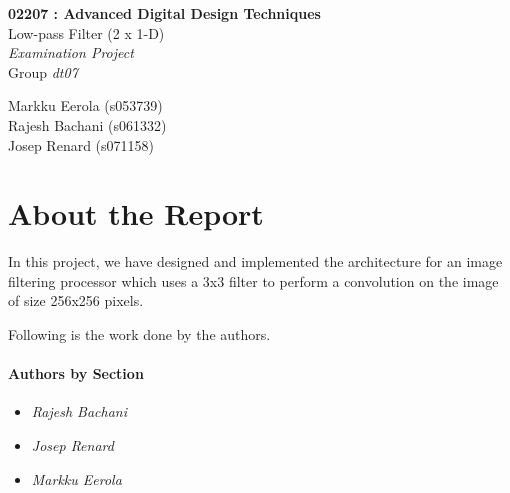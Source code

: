\documentclass[11pt,a4paper]{article}
\begin{document}
	

\begin{titlepage}

\thispagestyle{fancy}
\lhead{}
\rhead{}
\rule{0pt}{50pt}
\vspace{3cm}

\begin{center}
 	\huge{\textbf{02207 : Advanced Digital Design Techniques}}\\
 	\vspace{1cm}
 	\huge{Low-pass Filter (2 x 1-D)}\\
 	\vspace{1cm}
 	\huge{\textit{Examination Project}}\\
 	\vspace{1cm}
 	\huge{Group \textit{dt07}}\\
\end{center}

\vspace{4cm}

\begin{flushright}
	\LARGE{Markku Eerola (s053739)}\\
	\vspace{0.3cm}
	\LARGE{Rajesh Bachani (s061332)}\\
	\vspace{0.3cm}
	\LARGE{Josep Renard (s071158)}\\
\end{flushright}
\cfoot{\today}
\end{titlepage}

\newpage 
\tableofcontents

\newpage

\section{About the Report}
In this project, we have designed and implemented the architecture for an image filtering processor which uses a 3x3 filter to perform a convolution on the image of size 256x256 pixels.

Following is the work done by the authors.
\paragraph{Authors by Section}
\begin{itemize}
\item \textit{Rajesh Bachani} 
\item \textit{Josep Renard} 
\item \textit{Markku Eerola} \\
\end{itemize}
\end{document}
